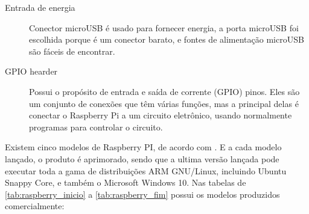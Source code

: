 \documentclass[
	12pt,				%
	openright,			%
	twoside,			%
	a4paper,			%
	chapter=TITLE,		%
	english,			%
	brazil				%
	]{abntex2}
\begin{document}
\begin{description}
\item[Entrada de energia] 
 Conector microUSB é usado para fornecer energia, a porta microUSB foi escolhida porque é um conector barato, e fontes de alimentação microUSB são fáceis de encontrar.

\item[GPIO hearder]
Possui o propósito de entrada e saída de corrente (GPIO) pinos. Eles são um conjunto de conexões que têm várias funções, mas a principal delas é conectar o Raspberry Pi a um circuito eletrônico, usando normalmente programas para controlar o circuito.


\end{description}

Existem cinco modelos de Raspberry PI, de acordo com . E a cada modelo lançado, o produto é aprimorado, sendo que a ultima versão lançada pode executar toda a gama de distribuições ARM GNU/Linux, incluindo Ubuntu Snappy Core, e também o Microsoft Windows 10. Nas tabelas de \ref{tab:raspberry_inicio} a \ref{tab:raspberry_fim} possui os modelos produzidos comercialmente:
\end{document}
